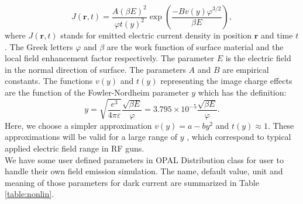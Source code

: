 \documentclass[a4paper,11pt]{article}
\begin{document}
\begin{equation*}
J(\mathbf{r},t) = \frac{A(\beta E)^2}{\varphi t(y)^2}\exp{(\frac{-B v(y)\varphi^{3/2}}{\beta E})},
\end{equation*}
where $J(\mathbf{r},t)$ stands for emitted electric current density in position $\mathbf{r}$ and time $t$. The Greek letters $\varphi$ and  $\beta$ are the work function of surface material and the local field enhancement factor respectively. The parameter $E$ is the electric field in the normal direction of surface. The parameters $A$ and $B$ are empirical constants. The functions $v(y)$ and $t(y)$ representing the image charge effects \cite{BC} are the function of the Fowler-Nordheim parameter $y$ which has the definition\cite{DE}:\\
\begin{equation*}
y = \sqrt{\frac{e^3}{4\pi\varepsilon}}\frac{\sqrt{\beta E}}{\varphi} = 3.795\times10^{-5}\frac{\sqrt{\beta E}}{\varphi}.
\end{equation*}
Here, we choose a simpler approximation \cite{DE} $v(y)=a-by^2$ and $t(y)\approx 1$. These approximations will be valid for a large range of $y$ , which correspond to typical applied electric field range in RF guns.\\   

We have some user defined parameters in OPAL Distribution class for user to handle their own field emission simulation. The name, default value, unit and meaning of those parameters for dark current are summarized in Table \ref{table:nonlin}.\\
\end{document}
